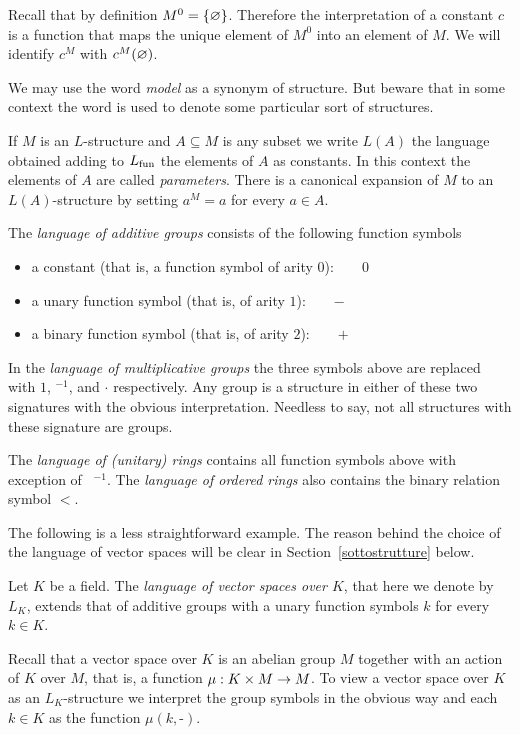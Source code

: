 Recall that by definition $M^0=\{\varnothing\}$. Therefore the interpretation of a constant $c$ is a function that maps the unique element of $M^0$ into an element of $M$. We will identify $c^M$ with $c^M(\varnothing)$.

We may use the word \emph{model\/} as a synonym of structure. But beware that in some context the word is used to denote some particular sort of structures.  

If $M$ is an $L$-structure and $A\subseteq M$ is any subset we write \emph{$L(A)$\/} the language obtained adding to $L_{\rm fun}$ the elements of $A$ as constants. In this context the elements of $A$ are called \emph{parameters}. There is a canonical expansion of $M$ to an $L(A)$-structure by setting $a^M=a$ for every $a\in A$.

\begin{example}\label{LgaLgmLau}
The \emph{language of additive groups\/} consists of the following function symbols\nobreak
\begin{itemize}
\item a constant (that is, a function symbol of arity $0$):\ \ \ \  $0$
\item a unary function symbol (that is, of arity $1$):\ \ \ \   $-$
\item a binary function symbol (that is, of arity $2$):\ \ \ \  $+$
\end{itemize}
In the \emph{language of multiplicative groups\/} the three symbols above are replaced with $1$, ${}^{-1}$, and $\cdot$ respectively. Any group is a structure in either of these two signatures with the obvious interpretation. Needless to say, not all structures with these signature are groups. 

The \emph{language of (unitary) rings\/} contains all function symbols above with exception of \ ${}^{-1}$. The  \emph{language of ordered rings\/} also contains the binary relation symbol $<$.\QED
\end{example}

The following is a less straightforward example. The reason behind the choice of the language of vector spaces will be clear in Section~\ref{sottostrutture} below. 

\begin{example}\label{linguaggio_spazi_vettoriali}
Let $K$ be a field. The \emph{language of vector spaces over $K$\/}, that here we denote by $L_K$, extends that of additive groups with a unary function symbols $k$ for every $k\in K$. 

Recall that a vector space over $K$ is an abelian group $M$ together with an action of $K$ over $M$, that is, a function $\mu:K\times M\rightarrow M$. To view a vector space over $K$ as an $L_K$-structure we interpret the group symbols in the obvious way and each $k\in K$ as the function $\mu(k,\mbox{-})$.\QED
\end{example}

